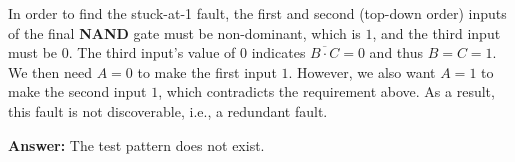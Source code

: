 In order to find the stuck-at-1 fault, the first and second (top-down order) inputs of the final \textbf{NAND} gate must be non-dominant, which is $1$, and the third input must be $0$. The third input's value of $0$ indicates $\overline{B \cdot C} = 0$ and thus $B = C = 1$. We then need $A = 0$ to make the first input $1$. However, we also want $A = 1$ to make the second input $1$, which contradicts the requirement above. As a result, this fault is not discoverable, i.e., a redundant fault.

\textbf{Answer:} The test pattern does not exist.


